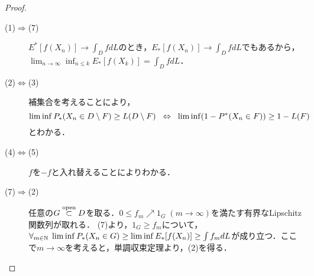 \documentclass[uplatex,dvipdfmx]{jsreport}
\begin{document}
\begin{proof}\mbox{}
    \begin{description}
        \item[(1)$\Rightarrow$(7)] 
        $E^*[f(X_n)]\to\int_DfdL$のとき，$E_*[f(X_n)]\to\int_DfdL$でもあるから，$\lim_{n\to\infty}\inf_{n\le k}E_*[f(X_k)]=\int_DfdL$．
        \item[(2)$\Leftrightarrow$(3)]
        補集合を考えることにより，
        \[\liminf P_*(X_n\in D\setminus F)\ge L(D\setminus F)\;\;\Leftrightarrow\;\;\liminf(1-P^*(X_n\in F))\ge 1-L(F)\]
        とわかる．
        \item[(4)$\Leftrightarrow$(5)]
        $f$を$-f$と入れ替えることによりわかる．
        \item[(7)$\Rightarrow$(2)]
        任意の$G\overset{\mathrm{open}}{\subset} D$を取る．$0\le f_m\nearrow 1_G\;(m\to\infty)$を満たす有界なLipschitz関数列が取れる．
        (7)より，$1_G\ge f_m$について，$\forall_{m\in\mathbb{N}}\;\liminf P_*(X_n\in G)\ge\liminf E_*[f(X_n)]\ge\int f_mdL$が成り立つ．ここで$m\to\infty$を考えると，単調収束定理より，(2)を得る．


\end{description}
\end{proof}
\end{document}
